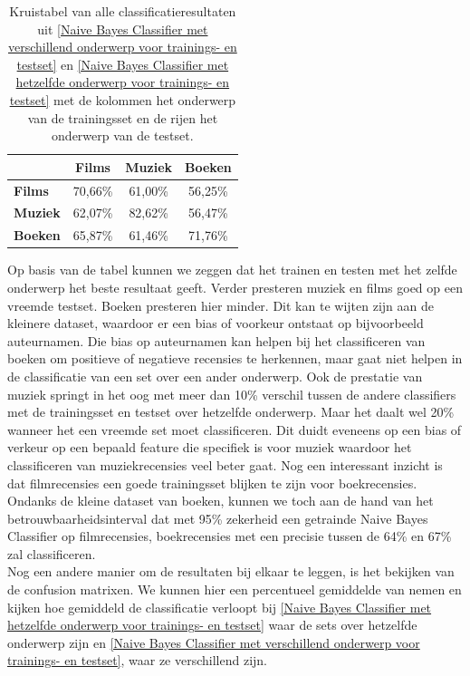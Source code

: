 \begin{table}[h]
\centering
\begin{tabular}{l|c|c|c|}
\cline{2-4}
                                      & \textbf{Films} & \textbf{Muziek} & \textbf{Boeken} \\ \hline
\multicolumn{1}{|l|}{\textbf{Films}} & 70,66\%         & 61,00\%         & 56,25\%         \\ \hline
\multicolumn{1}{|l|}{\textbf{Muziek}} & 62,07\%         & 82,62\%         & 56,47\%         \\ \hline
\multicolumn{1}{|l|}{\textbf{Boeken}} & 65,87\%         & 61,46\%         & 71,76\%         \\ \hline
\end{tabular}
\label{tab:alles}
\caption{Kruistabel van alle classificatieresultaten uit \ref{Naive Bayes Classifier met verschillend onderwerp voor trainings- en testset} en \ref{Naive Bayes Classifier met hetzelfde onderwerp voor trainings- en testset} met de kolommen het onderwerp van de trainingsset en de rijen het onderwerp van de testset.} 
\end{table}


Op basis van de tabel kunnen we zeggen dat het trainen en testen met het zelfde onderwerp het beste resultaat geeft. Verder presteren muziek en films goed op een vreemde testset.  Boeken presteren hier minder. Dit kan te wijten zijn aan de kleinere dataset, waardoor er een bias of voorkeur ontstaat op bijvoorbeeld auteurnamen. Die bias op auteurnamen kan helpen bij het classificeren van boeken om positieve of negatieve recensies te herkennen, maar gaat niet helpen in de classificatie van een set over een ander onderwerp. Ook de prestatie van muziek springt in het oog met meer dan 10\% verschil tussen de andere classifiers met de trainingsset en testset over hetzelfde onderwerp. Maar het daalt wel 20\% wanneer het een vreemde set moet classificeren. Dit duidt eveneens op een bias of verkeur op een bepaald feature die specifiek is voor muziek waardoor het classificeren van muziekrecensies veel beter gaat. Nog een interessant inzicht is dat filmrecensies een goede trainingsset blijken te zijn voor boekrecensies.  Ondanks de kleine dataset van boeken, kunnen we toch aan de hand van het betrouwbaarheidsinterval dat met 95\% zekerheid een getrainde Naive Bayes Classifier op filmrecensies, boekrecensies met een precisie tussen de 64\% en 67\% zal classificeren.\\
\newpage
Nog een andere manier om de resultaten bij elkaar te leggen, is het bekijken van de confusion matrixen. We kunnen hier een percentueel gemiddelde van nemen en kijken hoe gemiddeld de classificatie verloopt bij \ref{Naive Bayes Classifier met hetzelfde onderwerp voor trainings- en testset} waar de sets over hetzelfde onderwerp zijn en \ref{Naive Bayes Classifier met verschillend onderwerp voor trainings- en testset}, waar ze verschillend zijn.

